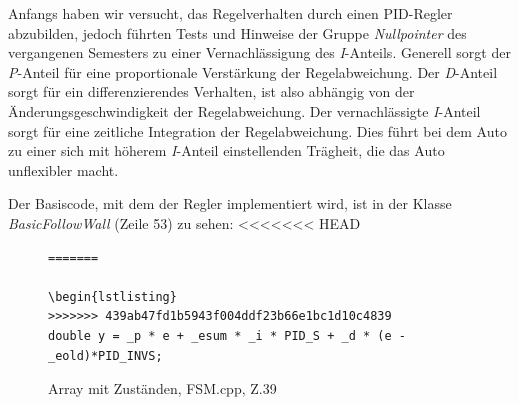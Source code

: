 Anfangs haben wir versucht, das Regelverhalten durch einen PID-Regler abzubilden, jedoch führten Tests und Hinweise der Gruppe \textit{Nullpointer} des vergangenen Semesters zu einer Vernachlässigung des \textit{I}-Anteils. Generell sorgt der \textit{P}-Anteil für eine proportionale Verstärkung der Regelabweichung. Der \textit{D}-Anteil sorgt für ein differenzierendes Verhalten, ist also abhängig von der Änderungsgeschwindigkeit der Regelabweichung.
Der vernachlässigte \textit{I}-Anteil sorgt für eine zeitliche Integration der Regelabweichung. Dies führt bei dem Auto zu einer sich mit höherem \textit{I}-Anteil einstellenden Trägheit, die das Auto unflexibler macht.

Der Basiscode, mit dem der Regler implementiert wird, ist in der Klasse \textit{BasicFollowWall} (Zeile 53) zu sehen:
<<<<<<< HEAD
\begin{figure}[thp]
	\begin{lstlisting}[style=json]
=======

\begin{lstlisting}
>>>>>>> 439ab47fd1b5943f004ddf23b66e1bc1d10c4839
double y = _p * e + _esum * _i * PID_S + _d * (e - _eold)*PID_INVS;
\end{lstlisting}
\centering
\caption{Array mit Zuständen, FSM.cpp, Z.39}
\end{figure}

